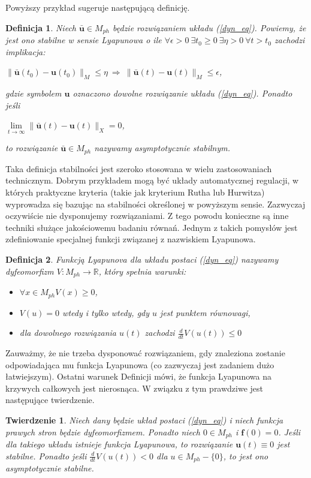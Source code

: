 \documentclass[12pt]{article}
\newtheorem{defi}{Definicja}
\newtheorem{tw}{Twierdzenie}
\begin{document}
Powyższy przykład sugeruje następującą definicję.
\begin{defi}\label{stable_point}
	Niech $ \bar{\textbf{u}} \in M_{ph} $ będzie rozwiązaniem układu (\ref{dyn_eq}). Powiemy, że jest ono stabilne w sensie Lyapunowa o ile $\forall \epsilon>0 \  \exists t_{0} \geq 0 \  \exists \eta>0 \  \forall t>t_{0}$ zachodzi implikacja:\newline
\centerline {$ 	\|\bar{\textbf{u}}(t_{0}) - \textbf{u}(t_{0}) \|_{M}  \leq \eta \  \Rightarrow \ \|\bar{\textbf{u}}(t) - \textbf{u}(t) \|_{M}  \leq \epsilon$,}
gdzie symbolem $ \textbf{u} $ oznaczono dowolne rozwiązanie układu (\ref{dyn_eq}).\newline
Ponadto jeśli \newline
\centerline{$ \lim\limits_{t \rightarrow \infty}\|\bar{\textbf{u}}(t) - \textbf{u}(t) \|_{X} = 0$,}
to rozwiązanie $ \bar{\textbf{u}} \in M_{ph} $ nazywamy asymptotycznie stabilnym.
\end{defi}
Taka definicja stabilności jest szeroko stosowana w wielu zastosowaniach technicznym. Dobrym przykładem mogą być układy automatycznej regulacji, w których praktyczne kryteria (takie jak kryterium Rutha lub Hurwitza) wyprowadza się bazując na stabilności określonej w powyższym sensie.\newline
Zazwyczaj oczywiście nie dysponujemy rozwiązaniami. Z tego powodu konieczne są inne techniki służące jakościowemu badaniu równań. Jednym z takich pomysłów jest zdefiniowanie specjalnej funkcji związanej z nazwiskiem Lyapunowa.
\newline
\begin{defi}
	Funkcją Lyapunova dla układu postaci (\ref{dyn_eq}) nazywamy dyfeomorfizm $ V: M_{ph} \rightarrow \mathbb{R} $, który spełnia warunki:
	\begin{itemize}
		\item $\forall x \in M_{ph} V(x) \geq 0$,
		\item $ V(u) = 0 $ wtedy i tylko wtedy, gdy $ u $ jest punktem równowagi,
		\item dla dowolnego rozwiązania $ u(t) $ zachodzi $ \frac{d}{dt}V(u(t)) \leq 0 $
	\end{itemize}
\end{defi}
Zauważmy, że nie trzeba dysponować rozwiązaniem, gdy znaleziona zostanie odpowiadająca mu funkcja Lyapunowa (co zazwyczaj jest zadaniem dużo łatwiejszym). Ostatni warunek  Definicji mówi, że funkcja Lyapunowa na krzywych całkowych jest nierosnąca. W związku z tym prawdziwe jest następujące twierdzenie.
\begin{tw}
	Niech dany będzie układ postaci (\ref{dyn_eq}) i niech funkcja prawych stron będzie dyfeomorfizmem. Ponadto niech $ 0 \in M_{ph} $ i $ \textbf{f}(0) = 0 $. Jeśli dla takiego układu istnieje funkcja Lyapunowa, to rozwiązanie $ \textbf{u}(t) \equiv 0 $ jest stabilne. Ponadto jeśli $ \frac{d}{dt}V(u(t)) < 0 $ dla $ u \in M_{ph} - \{0\} $, to jest ono asymptotycznie stabilne.
\end{tw}
\end{document}
